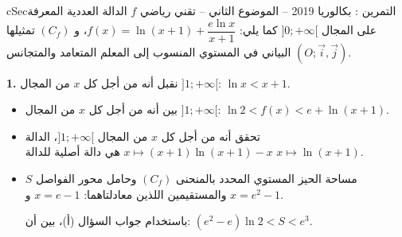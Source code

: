 \documentclass[12pt,a4paper]{article}
\newenvironment{BOX}[2]{\begin{otherlanguage}{english}\begin{arbox}{#1}{#2}}{\end{arbox}\end{otherlanguage}}
\newcounter{exo}
\newenvironment{tamrin}[1]{\stepcounter{exo}\begin{BOX}{cSec}{التمرين \theexo: #1}}{\end{BOX}}
\newenvironment{sq}{\begin{itemize}[leftmargin=2.4em,itemsep=3pt]}{\end{itemize}}
\newcommand{\qa}{\item[(أ)]}\newcommand{\qb}{\item[(ب)]}\newcommand{\qc}{\item[(جـ)]}\newcommand{\qd}{\item[(د)]}\newcommand{\qe}{\item[(هـ)]}
\newcommand{\QQ}[1]{\par\smallskip\textbf{#1.} }
\begin{document}
\begin{tamrin}{بكالوريا 2019 -- الموضوع الثاني -- تقني رياضي}
$f$ الدالة العددية المعرفة على المجال $]0;+\infty[$ كما يلي: $f(x)=\ln(x+1)+\dfrac{e\ln x}{x+1}$، و $(C_f)$ تمثيلها البياني في المستوي المنسوب إلى المعلم المتعامد والمتجانس $(O;\vec{i},\vec{j})$.

\QQ{1} نقبل أنه من أجل كل $x$ من المجال $]1;+\infty[$: $\ln x<x+1$.
\begin{sq}
\qa بين أنه من أجل كل $x$ من المجال $]1;+\infty[$: $\ln2<f(x)<e+\ln(x+1)$.
\qb تحقق أنه من أجل كل $x$ من المجال $]1;+\infty[$، الدالة $x\mapsto(x+1)\ln(x+1)-x$ هي دالة أصلية للدالة $x\mapsto\ln(x+1)$.
\qc $S$ مساحة الحيز المستوي المحدد بالمنحنى $(C_f)$ وحامل محور الفواصل والمستقيمين اللذين معادلتاهما: $x=e-1$ و $x=e^{2}-1$.

باستخدام جواب السؤال (أ)، بين أن: $\left(e^{2}-e\right)\ln2<S<e^{3}$.
\end{sq}
\end{tamrin}
\end{document}
